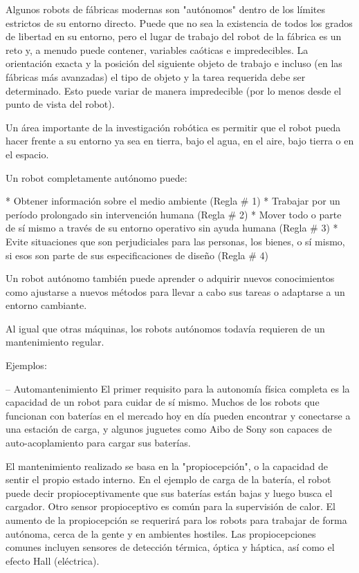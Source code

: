 Algunos robots de fábricas modernas son "autónomos" dentro de los límites estrictos de su entorno directo. Puede que no sea la existencia de todos los grados de libertad en su entorno, pero el lugar de trabajo del robot de la fábrica es un reto y, a menudo puede contener, variables caóticas e impredecibles. La orientación exacta y la posición del siguiente objeto de trabajo e incluso (en las fábricas más avanzadas) el tipo de objeto y la tarea requerida debe ser determinado. Esto puede variar de manera impredecible (por lo menos desde el punto de vista del robot). 

Un área importante de la investigación robótica es permitir que el robot pueda hacer frente a su entorno ya sea en tierra, bajo el agua, en el aire, bajo tierra o en el espacio.

Un robot completamente autónomo puede: 

* Obtener información sobre el medio ambiente (Regla # 1) 
* Trabajar por un período prolongado sin intervención humana (Regla # 2) 
* Mover todo o parte de sí mismo a través de su entorno operativo sin ayuda humana (Regla # 3) 
* Evite situaciones que son perjudiciales para las personas, los bienes, o sí mismo, si esos son parte de sus especificaciones de diseño (Regla # 4) 

Un robot autónomo también puede aprender o adquirir nuevos conocimientos como ajustarse a nuevos métodos para llevar a cabo sus tareas o adaptarse a un entorno cambiante. 

Al igual que otras máquinas, los robots autónomos todavía requieren de un mantenimiento regular. 

Ejemplos:

-- Automantenimiento 
El primer requisito para la autonomía física completa es la capacidad de un robot para cuidar de sí mismo. Muchos de los robots que funcionan con baterías en el mercado hoy en día pueden encontrar y conectarse a una estación de carga, y algunos juguetes como Aibo de Sony son capaces de auto-acoplamiento para cargar sus baterías. 

El mantenimiento realizado se basa en la "propiocepción", o la capacidad de sentir el propio estado interno. En el ejemplo de carga de la batería, el robot puede decir propioceptivamente que sus baterías están bajas y luego busca el cargador. Otro sensor propioceptivo es común para la supervisión de calor. El aumento de la propiocepción se requerirá para los robots para trabajar de forma autónoma, cerca de la gente y en ambientes hostiles. Las propiocepciones comunes incluyen sensores de detección térmica, óptica y háptica, así como el efecto Hall (eléctrica).

